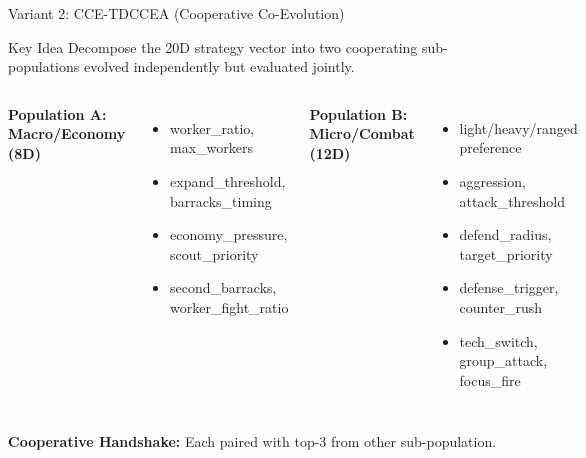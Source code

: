 \documentclass[aspectratio=169, 11pt]{beamer}
\begin{document}
\begin{frame}{Variant 2: CCE-TDCCEA (Cooperative Co-Evolution)}
\begin{block}{Key Idea}
Decompose the 20D strategy vector into two cooperating sub-populations evolved independently but evaluated jointly.
\end{block}
\vspace{0.15cm}
\begin{columns}[t]
    \textbf{Population A: Macro/Economy (8D)}
    \begin{itemize}\small
        \item worker\_ratio, max\_workers
        \item expand\_threshold, barracks\_timing
        \item economy\_pressure, scout\_priority
        \item second\_barracks, worker\_fight\_ratio
    \end{itemize}
    \textbf{Population B: Micro/Combat (12D)}
    \begin{itemize}\small
        \item light/heavy/ranged preference
        \item aggression, attack\_threshold
        \item defend\_radius, target\_priority
        \item defense\_trigger, counter\_rush
        \item tech\_switch, group\_attack, focus\_fire
    \end{itemize}
\end{columns}
\vspace{0.15cm}
\textbf{Cooperative Handshake:} Each paired with top-3 from other sub-population.\\

\end{frame}





\end{document}
